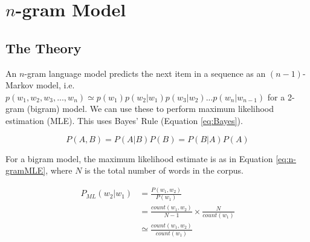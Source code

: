 \chapter{$n$-gram Model}\label{chap:n-gram}



\section{The Theory}

An $n$-gram language model predicts the next item in a sequence as an $(n-1)$-Markov model, i.e. $p(w_{1}, w_{2}, w_{3}, ..., w_{n})\simeq p(w_{1})p(w_{2}|w_{1})p(w_{3}|w_{2})...p(w_{n}|w_{n-1})$ for a 2-gram (bigram) model. We can use these to perform maximum likelihood estimation (MLE). This uses Bayes' Rule (Equation \ref{eq:Bayes}).%

\begin{equation}
\label{eq:Bayes}
P(A,B)=P(A|B)P(B)=P(B|A)P(A)
\end{equation}




For a bigram model, the maximum likelihood estimate is as in Equation \ref{eq:n-gramMLE}, where $N$ is the total number of words in the corpus.

\begin{subequations}
\begin{align}
P_{ML}(w_{2}|w_{1})&=\frac{P(w_{1}, w_{2})}{P(w_{1})}
\\
&= \frac{count(w_{1}, w_{2})}{N-1} \times \frac{N}{count(w_{1})}
\\
&\simeq\frac{count(w_{1}, w_{2})}{count(w_{1})} \label{eq:n-gramMLE}
\end{align}
\end{subequations}

